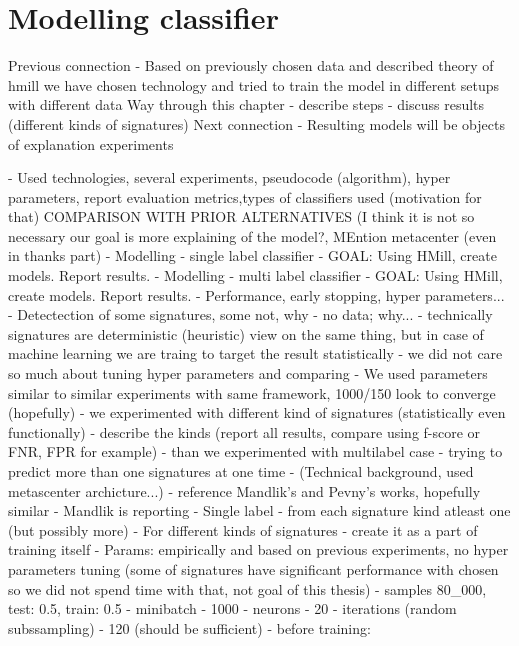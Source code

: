 \chapter{Modelling classifier}


Previous connection
- Based on previously chosen data and described theory of hmill we have chosen technology and tried to train the model in different setups with different data
Way through this chapter
- describe steps
- discuss results (different kinds of signatures)
Next connection
- Resulting models will be objects of explanation experiments


- Used technologies, several experiments, pseudocode (algorithm), hyper parameters, report evaluation metrics,types of classifiers used (motivation for that) COMPARISON WITH PRIOR ALTERNATIVES (I think it is not so necessary our goal is more explaining of the model?, MEntion metacenter (even in thanks part)
  - Modelling - single label classifier
    - GOAL: Using HMill, create models. Report results.
  - Modelling - multi label classifier
    - GOAL: Using HMill, create models. Report results.
  - Performance, early stopping, hyper parameters...
  - Detectection of some signatures, some not, why - no data; why...
    - technically signatures are deterministic (heuristic) view on the same thing, but in case of machine learning we are traing to target the result statistically
    - we did not care so much about tuning hyper parameters and comparing
       - We used parameters similar to similar experiments with same framework, 1000/150 look to converge (hopefully)
       - we experimented with different kind of signatures (statistically even functionally) - describe the kinds (report all results, compare using f-score or FNR, FPR for example)
       - than we experimented with multilabel case - trying to predict more than one signatures at one time
  - (Technical background, used metascenter archicture...)
  - reference Mandlik's and Pevny's works, hopefully similar
    - Mandlik is reporting
      - Single label - from each signature kind atleast one (but possibly more) - For different kinds of signatures - create it as a part of training itself
        - Params: empirically and based on previous experiments, no hyper parameters tuning (some of signatures have significant performance with chosen so we did not spend time with that, not goal of this thesis)
            - samples 80_000, test: 0.5, train: 0.5
            - minibatch - 1000
            - neurons - 20
            - iterations (random subssampling) - 120 (should be sufficient)
        - before training:
